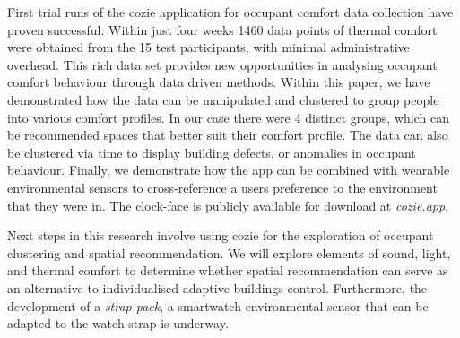 
First trial runs of the cozie application for occupant comfort data collection have proven successful. Within just four weeks 1460 data points of thermal comfort were obtained from the 15 test participants, with minimal administrative overhead. This rich data set provides new opportunities in analysing occupant comfort behaviour through data driven methods. Within this paper, we have demonstrated how the data can be manipulated and clustered to group people into various comfort profiles. In our case there were 4 distinct groups, which can be recommended spaces that better suit their comfort profile. The data can also be clustered via time to display building defects, or anomalies in occupant behaviour. Finally, we demonstrate how the app can be combined with wearable environmental sensors to cross-reference a users preference to the environment that they were in. The clock-face is publicly available for download at \emph{cozie.app}.

Next steps in this research involve using cozie for the exploration of occupant clustering and spatial recommendation. We will explore elements of sound, light, and thermal comfort to determine whether spatial recommendation can serve as an alternative to individualised adaptive buildings control. Furthermore, the development of a \emph{strap-pack}, a smartwatch environmental sensor that can be adapted to the watch strap is underway. 